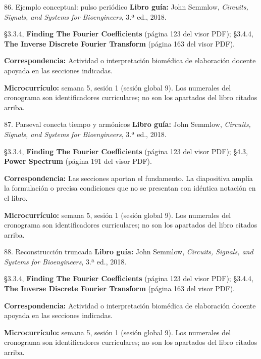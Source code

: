 \documentclass[
  10pt,
  ignorenonframetext,
  aspectratio=169,
  spanish,
]{beamer}
\begin{document}
\begin{frame}{86. Ejemplo conceptual: pulso periódico}
\label{ejemplo-conceptual-pulso-periuxf3dico}
\textbf{Libro guía:} John Semmlow, \emph{Circuits, Signals, and Systems
for Bioengineers}, 3.ª ed., 2018.

§3.3.4, \textbf{Finding The Fourier Coefficients} (página 123 del visor
PDF); §3.4.4, \textbf{The Inverse Discrete Fourier Transform} (página
163 del visor PDF).

\textbf{Correspondencia:} Actividad o interpretación biomédica de
elaboración docente apoyada en las secciones indicadas.

\textbf{Microcurrículo:} semana 5, sesión 1 (sesión global 9). Los
numerales del cronograma son identificadores curriculares; no son los
apartados del libro citados arriba.
\end{frame}

\begin{frame}{87. Parseval conecta tiempo y armónicos}
\label{parseval-conecta-tiempo-y-armuxf3nicos}
\textbf{Libro guía:} John Semmlow, \emph{Circuits, Signals, and Systems
for Bioengineers}, 3.ª ed., 2018.

§3.3.4, \textbf{Finding The Fourier Coefficients} (página 123 del visor
PDF); §4.3, \textbf{Power Spectrum} (página 191 del visor PDF).

\textbf{Correspondencia:} Las secciones aportan el fundamento. La
diapositiva amplía la formulación o precisa condiciones que no se
presentan con idéntica notación en el libro.

\textbf{Microcurrículo:} semana 5, sesión 1 (sesión global 9). Los
numerales del cronograma son identificadores curriculares; no son los
apartados del libro citados arriba.
\end{frame}

\begin{frame}{88. Reconstrucción truncada}
\label{reconstrucciuxf3n-truncada}
\textbf{Libro guía:} John Semmlow, \emph{Circuits, Signals, and Systems
for Bioengineers}, 3.ª ed., 2018.

§3.3.4, \textbf{Finding The Fourier Coefficients} (página 123 del visor
PDF); §3.4.4, \textbf{The Inverse Discrete Fourier Transform} (página
163 del visor PDF).

\textbf{Correspondencia:} Actividad o interpretación biomédica de
elaboración docente apoyada en las secciones indicadas.

\textbf{Microcurrículo:} semana 5, sesión 1 (sesión global 9). Los
numerales del cronograma son identificadores curriculares; no son los
apartados del libro citados arriba.
\end{frame}
\end{document}
